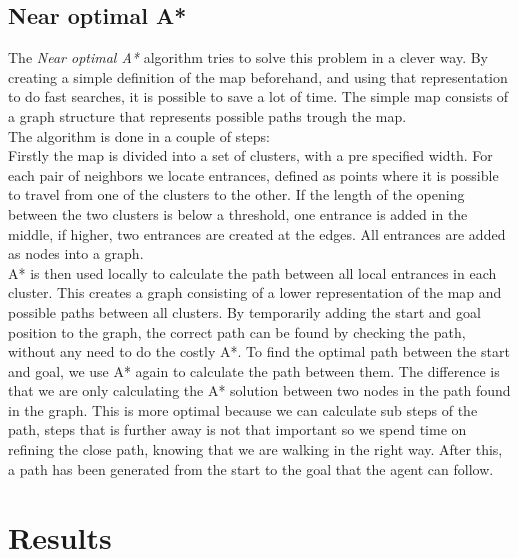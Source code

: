 \documentclass[12 pt]{article} %
\begin{document}
\begin{figure}	
	{}
	\label{fig:astarcat}
\end{figure}

\subsection{Near optimal A*}
The {\it Near optimal A*} algorithm tries to solve this problem in a clever way.
By creating a simple definition of the map beforehand, and using that representation to do fast searches, it is possible to save a lot of time.
The simple map consists of a graph structure that represents possible paths trough the map.\\

The algorithm is done in a couple of steps:\\

Firstly the map is divided into a set of clusters, with a pre specified width.
For each pair of neighbors we locate entrances, defined as points where it is possible to travel from one of the clusters to the other.
If the length of the opening between the two clusters is below a threshold, one entrance is added in the middle, if higher, two entrances are created at the edges.
All entrances are added as nodes into a graph.\\

A* is then used locally to calculate the path between all local entrances in each cluster. 
This creates a graph consisting of a lower representation of the map and possible paths between all clusters.
By temporarily adding the start and goal position to the graph, the correct path can be found by checking the path, without any need to do the costly A*.
To find the optimal path between the start and goal, we use A* again to calculate the path between them.
The difference is that we are only calculating the A* solution between two nodes in the path found in the graph.
This is more optimal because we can calculate sub steps of the path, steps that is further away is not that important so we spend time on refining the close path, knowing that we are walking in the right way.
After this, a path has been generated from the start to the goal that the agent can follow.

\section{Results}
\end{document}
